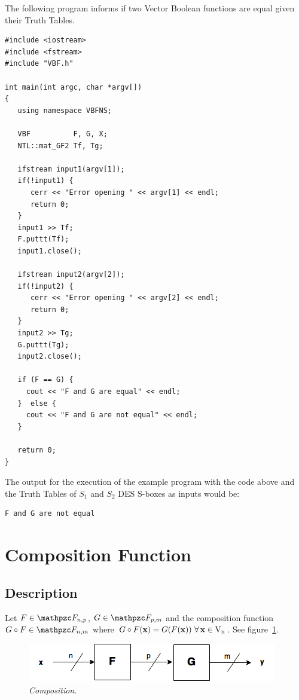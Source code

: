\begin{example}
The following program informs if two Vector Boolean functions are equal given their Truth Tables.

\begin{verbatim}
#include <iostream>
#include <fstream>
#include "VBF.h"

int main(int argc, char *argv[])
{
   using namespace VBFNS;

   VBF          F, G, X;
   NTL::mat_GF2 Tf, Tg;

   ifstream input1(argv[1]);
   if(!input1) {
      cerr << "Error opening " << argv[1] << endl;
      return 0;
   }
   input1 >> Tf;
   F.puttt(Tf);
   input1.close();

   ifstream input2(argv[2]);
   if(!input2) {
      cerr << "Error opening " << argv[2] << endl;
      return 0;
   }
   input2 >> Tg;
   G.puttt(Tg);
   input2.close();

   if (F == G) {
     cout << "F and G are equal" << endl;
   }  else {
     cout << "F and G are not equal" << endl;
   }
   
   return 0;
}
\end{verbatim}

The output for the execution of the example program with the code above and the Truth Tables of $S_1$ and $S_2$ DES S-boxes as inputs would be:

\begin{verbatim}
F and G are not equal
\end{verbatim}
\end{example}

\section{Composition Function}\label{sec:Composition}

\subsection{Description}

\begin{definition}
Let $F \in \funct{F}_{n,p}$, $G \in \funct{F}_{p,m}$ and the composition function $G \circ F \in \funct{F}_{n,m}$ where $G \circ F (\vec{x}) = G (F(\vec{x})) \ \fa \vec{x} \in \gf{V_n}$. See figure~\ref{fig:Composition}.
\end{definition}

\begin{figure}[htbp!]
\centering
\includegraphics{Composition}
\caption[Composition]{\textit{Composition}.}
\label{fig:Composition}
\end{figure}


